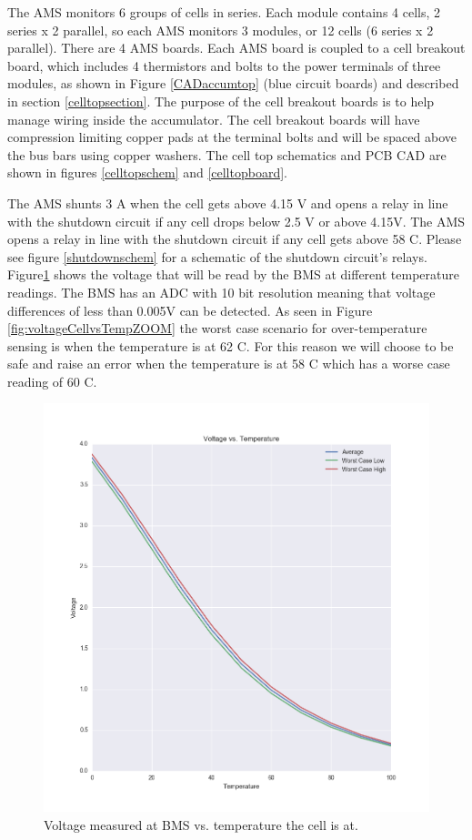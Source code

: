 \documentclass{article}
\begin{document}
    The AMS monitors 6 groups of cells in series. Each module contains 4 cells, 2 series x 2 parallel, so each AMS monitors 3 modules, or 12 cells (6 series x 2 parallel). There are 4 AMS boards. Each AMS board is coupled to a cell breakout board, which includes 4 thermistors and bolts to the power terminals of three modules, as shown in Figure \ref{CADaccumtop} (blue circuit boards) and described in section \ref{celltopsection}. The purpose of the cell breakout boards is to help manage wiring inside the accumulator. The cell breakout boards will have compression limiting copper pads at the terminal bolts and will be spaced above the bus bars using copper washers. The cell top schematics and PCB CAD are shown in figures \ref{celltopschem} and \ref{celltopboard}.

    The AMS shunts 3 A when the cell gets above 4.15 V and opens a relay in line with the shutdown circuit if any cell drops below 2.5 V or above 4.15V. The AMS opens a relay in line with the shutdown circuit if any cell gets above 58 \degree C. Please see figure \ref{shutdownschem} for a schematic of the shutdown circuit's relays.\\

    Figure\ref{fig:voltageCellvsTemp} shows the voltage that will be read by the BMS at different temperature readings. The BMS has an ADC with 10 bit resolution meaning that voltage differences of less than 0.005V can be detected. As seen in Figure \ref{fig:voltageCellvsTempZOOM} the worst case scenario for over-temperature sensing is when the temperature is at 62 \degree C. For this reason we will choose to be safe and raise an error when the temperature is at 58 \degree C which has a worse case reading of 60 \degree C.

        \begin{figure}[H]
        \centering
        \includegraphics[width =0.6 \textwidth]{VoltageVSTemp.png}
        \caption{Voltage measured at BMS vs. temperature the cell is at.}
        \label{fig:voltageCellvsTemp}
        \end{figure}
\end{document}
